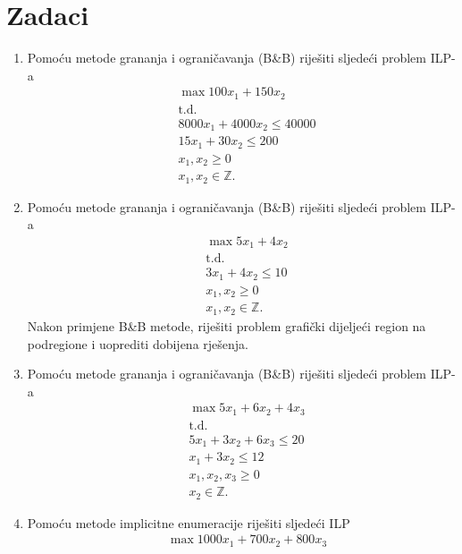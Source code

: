\documentclass[b5paper, utf8, 11pt, colorlinks]{book}
\theoremstyle{definition}
\begin{document}
 \section{Zadaci}
 \begin{enumerate}
 	\item %
 	Pomoću metode grananja i ograničavanja (B\&B) riješiti sljedeći problem ILP-a
 	\begin{align*}
 		&\max 100 x_1 + 150 x_2 \\
 		&\mbox{t.d.} \\
 		& 8000 x_1 + 4000 x_2 \leq 40 000 \\
 		& 15 x_1 + 30 x_2 \leq 200 \\
 		& x_1, x_2 \geq 0 \\
 		& x_1, x_2 \in \mathbb{Z}.
 	\end{align*}
   \item %
   	Pomoću metode grananja i ograničavanja  (B\&B) riješiti sljedeći problem ILP-a
   \begin{align*}
   	    &\max 5 x_1 + 4 x_2 \\
   	    &\mbox{t.d.} \\
   	    & 3 x_1 + 4 x_2 \leq 10 \\
   	    & x_1, x_2 \geq 0 \\
   	    & x_1, x_2 \in \mathbb{Z}.
   \end{align*}
Nakon primjene B\&B metode, riješiti problem grafički dijeljeći region na podregione i uoprediti dobijena rješenja. 
\item 	Pomoću metode grananja i ograničavanja  (B\&B) riješiti sljedeći problem ILP-a
\begin{align*}
	 &\max 5x_1 + 6 x_2 + 4 x_3 \\
	 &\mbox{t.d.} \\
	 & 5x_1 + 3 x_2 + 6 x_3 \leq 20 \\
	 & x_1 + 3x_2 \leq 12 \\
	 & x_1,x_2, x_3 \geq 0 \\
	 & x_2 \in \mathbb{Z}.
\end{align*}
\item %
 Pomoću metode implicitne enumeracije riješiti sljedeći ILP
\begin{align*}
  &\max 1000 x_1 + 700 x_2 + 800 x_3 \\

\end{align*}
\end{enumerate}
\end{document}
